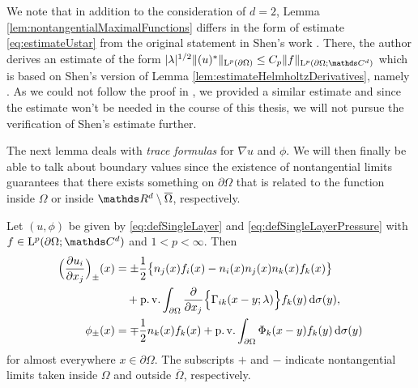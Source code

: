 \begin{rem}
  We note that in addition to the consideration of $d = 2$, Lemma \ref{lem:nontangentialMaximalFunctions} differs in the form of estimate \eqref{eq:estimateUstar} from the original statement in Shen's work \cite[Lem. 3.2]{Shen2012}.
  There, the author derives an estimate of the form $|\lambda|^{1/2}\|(u)^*\|_{\Ell^p(\partial\Omega)} \leq C_p \|f\|_{\Ell^p(\partial\Omega; \C^d)}$ which is based on Shen's version of Lemma \ref{lem:estimateHelmholtzDerivatives}, namely \cite[Lem. 2.1]{Shen2012}.
  As we could not follow the proof in \cite{Shen2012}, we provided a similar estimate and since the estimate won't be needed in the course of this thesis, we will not pursue the verification of Shen's estimate further.
\end{rem}

The next lemma deals with \emph{trace formulas} for $\nabla u$ and $\phi$. 
We will then finally be able to talk about boundary values since the existence of nontangential limits guarantees that there exists something on $\partial\Omega$ that is related to the function inside $\Omega$ or inside $\R^d \setminus \overline\Omega$, respectively.

\begin{lem}
  \label{lem:traceFormulas}
  Let $(u,\phi)$ be given by \eqref{eq:defSingleLayer} and \eqref{eq:defSingleLayerPressure} with $f \in \Ell^p(\partial\Omega; \C^d)$ and $1 < p < \infty$.
  Then
  \begin{align}
    \Big( \frac{\partial u_i}{\partial x_j} \Big)_{\pm}(x) 
    &= \pm \frac{1}{2} \big\{ n_j(x) f_i(x) - n_i(x) n_j(x) n_k(x) f_k(x) \big\} \nonumber\\
    &\quad+ \operatorname{p. v.} \int_{\partial\Omega} \frac{\partial}{\partial x_j} \Big\{ \Gamma_{ik} (x - y; \lambda) \Big\} f_k(y) \, {\operatorname{d}\!{\sigma}}(y), \label{eq:traceFormula} \\
    \phi_\pm(x) &= \mp \frac{1}{2} n_k(x) f_k(x) + \operatorname{p. v.}\int_{\partial\Omega} \Phi_k(x - y) f_k(y) \, {\operatorname{d}\!{\sigma}}(y) \nonumber
  \end{align}
  for almost everywhere $x \in \partial\Omega$.
  The subscripts $+$ and $-$ indicate nontangential limits taken inside $\Omega$ and outside $\overline\Omega$, respectively.
\end{lem}

